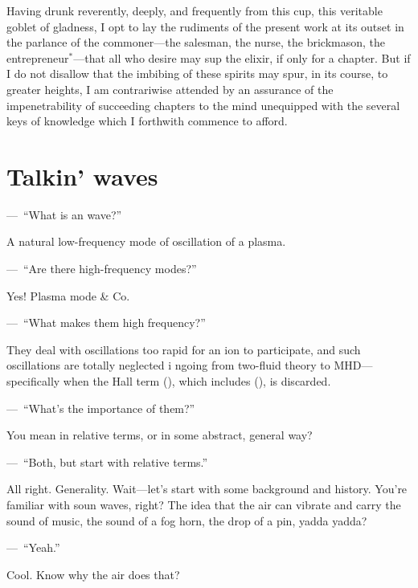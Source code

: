 Having drunk reverently, deeply, and frequently from this cup, this
veritable goblet of gladness, I opt to lay the rudiments of the
present work at its outset in the parlance of the commoner---the
salesman, the nurse, the brickmason, the entrepreneur$^*$---that all
who desire may sup the elixir, if only for a chapter. But if I do not
disallow that the imbibing of these spirits may spur, in its course,
to greater heights, I am contrariwise attended by an assurance of the
impenetrability of succeeding chapters to the mind unequipped with the
several keys of knowledge which I forthwith commence to afford.

\section{Talkin' waves}

\newlength{\savedparindent}
\newlength{\savedparskip}
\setlength{\savedparindent}{\parindent}
\setlength{\savedparskip}{\parskip}

\setlength\parindent{0pt}
\setlength\parskip{1ex plus 2pt minus 1pt}
\newcommand\X{\par\noindent---~}

\X ``What is an \Alf wave?''  

A natural low-frequency mode of
oscillation of a plasma.

\X ``Are there high-frequency modes?''  

Yes! Plasma mode \& Co.

\X ``What makes them high frequency?''


They deal with oscillations too rapid for an ion to participate,
and such oscillations are totally neglected i ngoing from two-fluid
theory to MHD---specifically when the Hall term (), which includes (),
is discarded.

\X ``What's the importance of them?''  

You mean in relative terms, or in some abstract, general way?

\X ``Both, but start with relative terms.''

All right. Generality. Wait---let's
start with some background and history. You're familiar with soun
waves, right? The idea that the air can vibrate and carry the sound of
music, the sound of a fog horn, the drop of a pin, yadda yadda?

\X ``Yeah.''


Cool. Know why the air does that?


